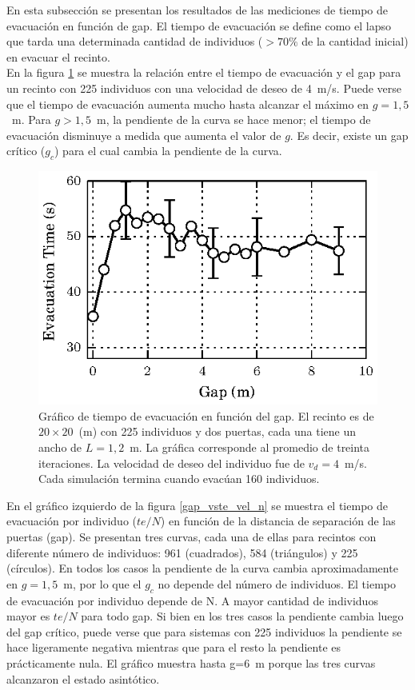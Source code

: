 En esta subsección se presentan los resultados de las mediciones de tiempo de evacuación en función de gap.
El tiempo de evacuación se define como el lapso que tarda una determinada cantidad de individuos ($>70\%$ de la cantidad inicial) en evacuar el recinto. \\

En la figura \ref{gap_vste_225_v4} se muestra la relación entre el tiempo de evacuación y el gap para un recinto con 225 individuos con una velocidad de deseo de 4~m/s. Puede verse que el tiempo de evacuación aumenta mucho hasta alcanzar el máximo en $g=1,5$~m. Para $g>1,5$~m, la pendiente de la curva se hace menor; el tiempo de evacuación disminuye a medida que aumenta el valor de $g$. 
Es decir, existe un gap crítico ($g_c$) para el cual cambia la pendiente de la curva.

\begin{figure}[H]
    \centering
    \includegraphics[scale=1.6]{figuras/gap_vste_225_v4.eps}
    \caption[width=5cm]{Gráfico de tiempo de evacuación en función del gap. El recinto es de $20\times 20$~(m) con 225 individuos y dos puertas, cada una tiene un ancho de $L=1,2$~m. La gráfica corresponde al promedio de treinta iteraciones. La velocidad de deseo del individuo fue de $v_d=4$~m/s. Cada simulación termina cuando evacúan 160 individuos.}
    \label{gap_vste_225_v4}
\end{figure}

En el gráfico izquierdo de la figura \ref{gap_vste_vel_n} se muestra el tiempo de evacuación por individuo ($te/N$) en función de la distancia de separación de las puertas (gap). Se presentan tres curvas, cada una de ellas para recintos con diferente número de individuos: 961 (cuadrados), 584 (triángulos) y 225 (círculos). En todos los casos la pendiente de la curva cambia aproximadamente en $g=1,5$~m, por lo que el $g_c$ no depende del número de individuos. 
El tiempo de evacuación por individuo depende de N. A mayor cantidad de individuos mayor es $te/N$ para todo gap. 
Si bien en los tres casos la pendiente cambia luego del gap crítico, puede verse que para sistemas con 225 individuos la pendiente se hace ligeramente negativa mientras que para el resto la pendiente es prácticamente nula. El gráfico muestra hasta g=6~m porque las tres curvas alcanzaron el estado asintótico. \\

